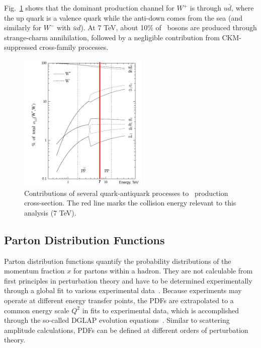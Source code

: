 Fig.~\ref{fig:theory:Wprod} shows that the dominant production channel for $W^+$ is through $u\bar{d}$, where the up quark is a valence quark while the anti-down comes from the sea (and similarly for $W^-$ with $\bar{u}d$). At 7 TeV, about 10\% of \Wboson\ bosons are produced through strange-charm annihilation, followed by a negligible contribution from CKM-suppressed cross-family processes.

\begin{figure}[phtb]
  \begin{center}
    \includegraphics[width=0.55\textwidth]{theory/fig/Wprod}
    \caption{ Contributions of several quark-antiquark processes to \Wboson\ production cross-section. The red line marks the collision energy relevant to this analysis (7 TeV). }
    \label{fig:theory:Wprod}
 \end{center}
\end{figure}

\subsection{Parton Distribution Functions}
\label{chap:pdf_theory}

Parton distribution functions quantify the probability distributions of the momentum fraction $x$ for partons within a hadron. They are not calculable from first principles in perturbation theory and have to be determined experimentally through a global fit to various experimental data~\cite{pdfmaster}. Because experiments may operate at different energy transfer points, the PDFs are extrapolated to a common energy scale $Q^2$ in fits to experimental data, which is accomplished through the so-called DGLAP evolution equations~\cite{Dokshitzer:1977sg,Gribov:1972ri,Altarelli:1977zs}. Similar to scattering amplitude calculations, PDFs can be defined at different orders of perturbation theory.

